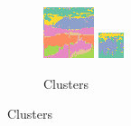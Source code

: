 \documentclass[11pt,a4paper]{article}
\begin{document}
\begin{figure}
\begin{subfigure}[b]{0.3\textwidth}
        \includegraphics[width=\textwidth]{figures/dino/tile_2/219090_seg.png}
        \includegraphics[width=\textwidth]{figures/dino/tile_2/253027_seg.png}
        \caption{Clusters}

\end{subfigure}
\end{figure}
\end{document}

